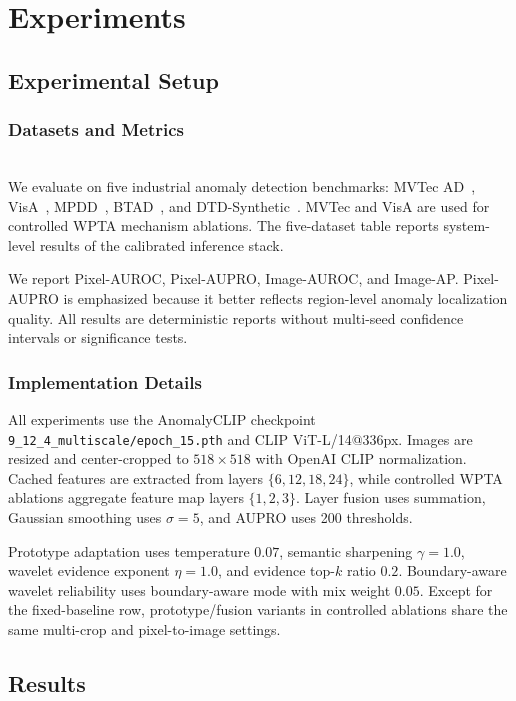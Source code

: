\documentclass[runningheads]{llncs}
\begin{document}
\section{Experiments}

\subsection{Experimental Setup}

\subsubsection{Datasets and Metrics}
\mbox{}\\
\noindent
We evaluate on five industrial anomaly detection benchmarks: MVTec AD~\cite{bergmann2019mvtec,bergmann2021mvtec}, VisA~\cite{zou2022visa}, MPDD~\cite{jezek2021deep}, BTAD~\cite{mishra2021vt}, and DTD-Synthetic~\cite{aota2023zero}. MVTec and VisA are used for controlled WPTA mechanism ablations. The five-dataset table reports system-level results of the calibrated inference stack.

We report Pixel-AUROC, Pixel-AUPRO, Image-AUROC, and Image-AP. Pixel-AUPRO is emphasized because it better reflects region-level anomaly localization quality. All results are deterministic reports without multi-seed confidence intervals or significance tests.

\subsubsection{Implementation Details}
All experiments use the AnomalyCLIP checkpoint \texttt{9\_12\_4\_multiscale/epoch\_15.pth} and CLIP ViT-L/14@336px. Images are resized and center-cropped to $518\times518$ with OpenAI CLIP normalization. Cached features are extracted from layers $\{6,12,18,24\}$, while controlled WPTA ablations aggregate feature map layers $\{1,2,3\}$. Layer fusion uses summation, Gaussian smoothing uses $\sigma=5$, and AUPRO uses 200 thresholds.

Prototype adaptation uses temperature $0.07$, semantic sharpening $\gamma=1.0$, wavelet evidence exponent $\eta=1.0$, and evidence top-$k$ ratio $0.2$. Boundary-aware wavelet reliability uses boundary-aware mode with mix weight $0.05$. Except for the fixed-baseline row, prototype/fusion variants in controlled ablations share the same multi-crop and pixel-to-image settings.

\subsection{Results}
\end{document}
